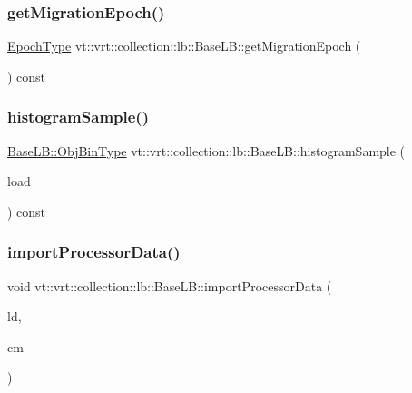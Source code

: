 \subsubsection{\texorpdfstring{get\+Migration\+Epoch()}{getMigrationEpoch()}}
{\footnotesize\ttfamily \hyperlink{namespacevt_a985a5adf291c34a3ca263b3378388236}{Epoch\+Type} vt\+::vrt\+::collection\+::lb\+::\+Base\+L\+B\+::get\+Migration\+Epoch (\begin{DoxyParamCaption}{ }\end{DoxyParamCaption}) const}

\mbox{\label{structvt_1_1vrt_1_1collection_1_1lb_1_1_base_l_b_a73ede03ca02dc385fcde2bd067978a4a}} 
\subsubsection{\texorpdfstring{histogram\+Sample()}{histogramSample()}}
{\footnotesize\ttfamily \hyperlink{structvt_1_1vrt_1_1collection_1_1lb_1_1_base_l_b_ae0bff8fcf0dec0abc1d81836cf1d060a}{Base\+L\+B\+::\+Obj\+Bin\+Type} vt\+::vrt\+::collection\+::lb\+::\+Base\+L\+B\+::histogram\+Sample (\begin{DoxyParamCaption}\item[{\hyperlink{structvt_1_1vrt_1_1collection_1_1lb_1_1_base_l_b_a215e22b9f12678303f49615ae3be05cc}{Load\+Type} const \&}]{load }\end{DoxyParamCaption}) const}

\mbox{\label{structvt_1_1vrt_1_1collection_1_1lb_1_1_base_l_b_a0a3c06181a20994a9263e680f3385bd1}} 
\subsubsection{\texorpdfstring{import\+Processor\+Data()}{importProcessorData()}}
{\footnotesize\ttfamily void vt\+::vrt\+::collection\+::lb\+::\+Base\+L\+B\+::import\+Processor\+Data (\begin{DoxyParamCaption}\item[{\hyperlink{structvt_1_1vrt_1_1collection_1_1lb_1_1_base_l_b_aa286d31a0820a8fc9218ccb858368fca}{Element\+Load\+Type} const \&}]{ld,  }\item[{\hyperlink{structvt_1_1vrt_1_1collection_1_1lb_1_1_base_l_b_ac3f8560bfe41aa593eb7d5bd1241cc4c}{Element\+Comm\+Type} const \&}]{cm }\end{DoxyParamCaption})}

